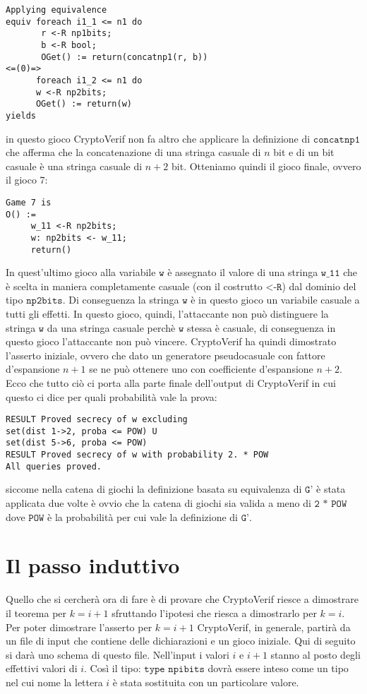 \documentclass[a4paper,openright,twoside,12pt]{report}
\begin{document}
\begin{verbatim} 
Applying equivalence
equiv foreach i1_1 <= n1 do 
       r <-R np1bits; 
       b <-R bool; 
       OGet() := return(concatnp1(r, b))
<=(0)=>
      foreach i1_2 <= n1 do 
      w <-R np2bits; 
      OGet() := return(w)
yields
\end{verbatim}
in questo gioco CryptoVerif non fa altro che applicare la definizione di $\texttt{concatnp1}$ che afferma che la concatenazione di una stringa casuale di $n$ bit e di un bit casuale \`e una stringa casuale di $n+2$ bit.
Otteniamo quindi il gioco finale, ovvero il gioco 7:
\begin{verbatim}
Game 7 is
O() :=
     w_11 <-R np2bits;
     w: np2bits <- w_11;
     return()
\end{verbatim}
In quest'ultimo gioco alla variabile $\texttt{w}$ \`e assegnato il valore di una stringa $\texttt{w\_11}$ che \`e scelta in maniera completamente casuale (con il costrutto $\texttt{<-R}$) dal dominio del tipo $\texttt{np2bits}$.
Di conseguenza la stringa $\texttt{w}$ \`e in questo gioco un variabile casuale a tutti gli effetti.
In questo gioco, quindi, l'attaccante non pu\`o distinguere la stringa $\texttt{w}$ da una stringa casuale perch\`e $\texttt{w}$ stessa \`e casuale, di conseguenza in questo gioco l'attaccante non pu\`o vincere.
CryptoVerif ha quindi dimostrato l'asserto iniziale, ovvero che dato un generatore pseudocasuale con fattore d'espansione $n+1$ se ne pu\`o ottenere uno con coefficiente d'espansione $n+2$.
Ecco che tutto ci\`o ci porta alla parte finale dell'output di CryptoVerif in cui questo ci dice per quali probabilit\`a vale la prova:
\begin{verbatim} 
RESULT Proved secrecy of w excluding 
set(dist 1->2, proba <= POW) U 
set(dist 5->6, proba <= POW)
RESULT Proved secrecy of w with probability 2. * POW
All queries proved.
\end{verbatim}
siccome nella catena di giochi la definizione basata su equivalenza di $\texttt{G'}$ \`e stata applicata due volte \`e ovvio che la catena di giochi sia valida a meno di $\texttt{2 * POW}$ dove $\texttt{POW}$ \`e la probabilit\`a
per cui vale la definizione di $\texttt{G'}$.




\section{Il passo induttivo}
Quello che si cercher\`a ora di fare \`e di provare che CryptoVerif riesce a dimostrare il teorema per $k=i+1$ sfruttando l'ipotesi che riesca a dimostrarlo per $k=i$.
Per poter dimostrare l'asserto per $k=i+1$ CryptoVerif, in generale, partir\`a da un file di input che contiene delle dichiarazioni e un gioco iniziale. Qui di seguito
si dar\`a uno schema di questo file. Nell'input i valori $i$ e $i+1$ stanno al posto degli effettivi valori di $i$. Cos\`i il tipo: $\texttt{type npibits}$ dovr\`a essere inteso
come un tipo nel cui nome la lettera $i$ \`e stata sostituita con un particolare valore.
\end{document}

